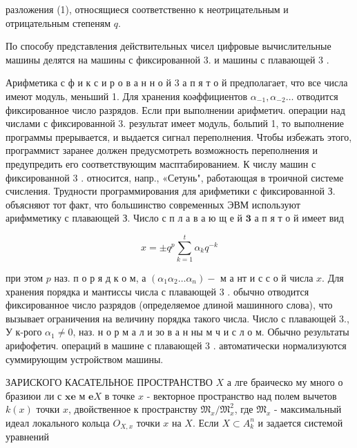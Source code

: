 \documentclass[10pt]{article}
\begin{document}
разложения (1), относящиеся соответственно к неотрицательным и отрицательным степеням $q$.



По способу представления действительных чисел цифровые вычислительные машины делятся на машины с фиксированной 3. и машины с плавающей 3 .



Арифметика с ф и к с и р о в а н н о й 3 а п я т о й предполагает, что все числа имеют модуль, меньший 1. Для хранения коәффициентов $\alpha_{-1}, \alpha_{-2} \ldots$ отводится фиксированное число разрядов. Если при выполнении арифметич. операции над числами с фиксированной 3. результат имеет модуль, больпий 1, то выполнение программы прерывается, и выдается сигнал переполнения. Чтобы избежать этого, программист заранее должен предусмотреть возможность переполнения и предупредить его соответствующим масптабированием. К числу машин с фиксированной 3 . относится, напр., «Сетунь", работающая в троичной системе счисления. Трудности программирования для арифметики с фиксированной З. объясняют тот факт, что большинство современных ЭВМ используют арифмметику с плавающей З. Число с п л а в а ю щ е й $\mathbf{3}$ а п я т о й имеет вид



\[

x= \pm q^{p} \sum_{k=1}^{t} \alpha_{k} q^{-k}

\]



при этом $p$ наз. п о р я д к о м, а $\left(\alpha_{1} \alpha_{2} \ldots \alpha_{n}\right)-$ м а нт и с с о й числа $x$. Для хранения порядка и мантиссы числа с плавающей 3 . обычно отводится фиксированное число разрядов (определяемое длиной машинного слова), что вызывает ограничения на величину порядка такого числа. Число с плавающей 3., У к-рого $\alpha_{1} \neq 0$, наз. н о р м а л и зо в а н ны м ч и с л о м. Обычно результаты арифофетич. операций в машине с плавающей 3 . автоматически нормализуются суммирующим устройством машины.



ЗАРИСКОГО КАСАТЕЛЬНОЕ ПРОСТРАНСТВО $\underset{ }{X}$ а лге браическо му много о бразиюи ли с $\mathbf{x} \mathbf{e}$ м $\mathbf{e} X$ в точке $x$ - векторное пространство над полем вычетов $k(x)$ точки $x$, двойственное к пространству $\mathfrak{M}_{x} / \mathfrak{M}_{x}^{2}$, где $\mathfrak{M}_{x}$ - максимальный идеал локального кольца $O_{X, x}$ точки $x$ на $X$. Если $X \subset A_{k}^{n}$ и задается системой уравнений
\end{document}

